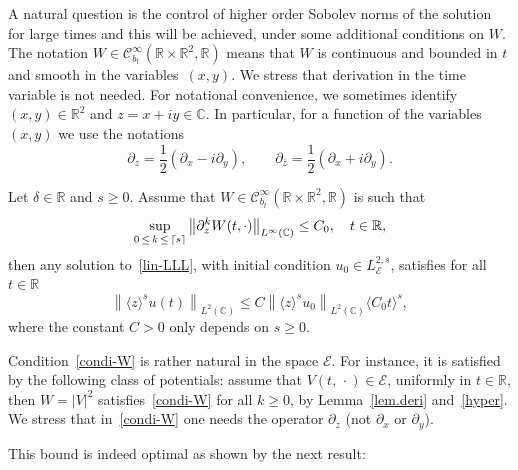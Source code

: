 \documentclass[AHL,Unicode,published]{cedram}
\DeclarePairedDelimiter\ceil{\lceil}{\rceil}
\newcommand{\C}{\mathbb{C}}
\newcommand{\R}{\mathbb{R}}
\newcommand{\E}{\mathcal{E}}
\newcommand{\clC}{\mathcal{C}}
\newcommand{\ov}{\overline}
\newcommand{\<}{\langle}
\renewcommand{\>}{\rangle}
\newcommand{\R}{\mathbb{R}}
\begin{document}
A natural question is the control of higher order Sobolev norms of the solution for large times and this will be achieved, under some additional conditions on $W$. The notation $W \in \clC^{\infty}_{b_t}(\R\times \R^2, \R)$ means that $W$ is continuous and bounded in $t$ and smooth in the variables~$(x,y)$. We stress that derivation in the time variable is not needed. For notational convenience, we sometimes identify $(x,y) \in \R^2$ and $z=x+iy \in \C$. In particular, for a function of the variables $(x,y)$ we use the notations
\begin{equation}\label{not-der}
\partial_z=\frac12\left(\partial_x-i\partial_y\right), \qquad \partial_{\ov{z}}=\frac12\left(\partial_x+i\partial_y\right).
\end{equation}



\begin{theo}\label{thm2.2}
Let $\delta \in \R$ and $s\geq 0$. Assume that $W \in \clC^{\infty}_{b_t}(\R\times \R^2, \R)$ is such that
\begin{equation}\label{condi-W}
\sup_{0\,\leq\,k\,\leq\,\ceil[]s} \left\|\partial^k_z W(t,\cdot)\right\|_{L^{\infty}(\C)}\leq C_0, \quad t\in \R,
\end{equation}
then any solution to~\eqref{lin-LLL}, with initial condition $u_0 \in L^{2,s}_\E$, satisfies for all $t\in \R$
\begin{equation}\label{condi-major}
\left\|\<z\>^s u(t)\right\|_{L^{2}(\C)} \leq C\left\|\<z\>^s u_0\right\|_{L^{2}(\C)} \<C_0 t\>^{s},
\end{equation}
where the constant $C>0$ only depends on $s\ge 0$.
\end{theo}



Condition~\eqref{condi-W} is rather natural in the space $\E$. For instance, it is satisfied by the following class of potentials: assume that $V(t,\,\cdot) \in \E$, uniformly in $t\in \R$, then $W=|V|^2$ satisfies~\eqref{condi-W} for all $k \geq 0$, by Lemma~\ref{lem.deri} and~\eqref{hyper}. We stress that in~\eqref{condi-W} one needs the operator $\partial_z$ (not $\partial_x$ or $\partial_y$).



This bound is indeed optimal as shown by the next result:
\end{document}
